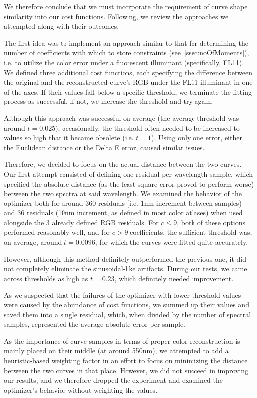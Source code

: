 We therefore conclude that we must incorporate the requirement of curve shape similarity into our cost functions. Following, we review the approaches we attempted along with their outcomes.

The first idea was to implement an approach similar to that for determining the number of coefficients with which to store constraints (see~\cref{ssec:noOfMoments}), i.e. to utilize the color error under a fluorescent illuminant (specifically, FL11). We defined three additional cost functions, each specifying the difference between the original and the reconstructed curve's RGB under the FL11 illuminant in one of the axes. If their values fall below a specific threshold, we terminate the fitting process as successful, if not, we increase the threshold and try again.

Although this approach was successful on average (the average threshold was around $t = 0.025$), occasionally, the threshold often needed to be increased to values so high that it became obsolete (i.e. $t = 1$). Using only one error, either the Euclidean distance or the Delta E error, caused similar issues.

Therefore, we decided to focus on the actual distance between the two curves. Our first attempt consisted of defining one residual per wavelength sample, which specified the absolute distance (as the least square error proved to perform worse) between the two spectra at said wavelength. We examined the behavior of the optimizer both for around 360 residuals (i.e. 1nm increment between samples) and 36 residuals (10nm increment, as defined in most color atlases) when used alongside the 3 already defined RGB residuals. For $c \le 9$, both of these options performed reasonably well, and for $c > 9$ coefficients, the sufficient threshold was, on average, around $t = 0.0096$, for which the curves were fitted quite accurately.

However, although this method definitely outperformed the previous one, it did not completely eliminate the sinusoidal-like artifacts. During our tests, we came across thresholds as high as $t = 0.23$, which definitely needed improvement.

As we suspected that the failures of the optimizer with lower threshold values were caused by the abundance of cost functions, we summed up their values and saved them into a single residual, which, when divided by the number of spectral samples, represented the average absolute error per sample.

As the importance of curve samples in terms of proper color reconstruction is mainly placed on their middle (at around 550nm), we attempted to add a heuristic-based weighting factor in an effort to focus on minimizing the distance between the two curves in that place. However, we did not succeed in improving our results, and we therefore dropped the experiment and examined the optimizer's behavior without weighting the values.

